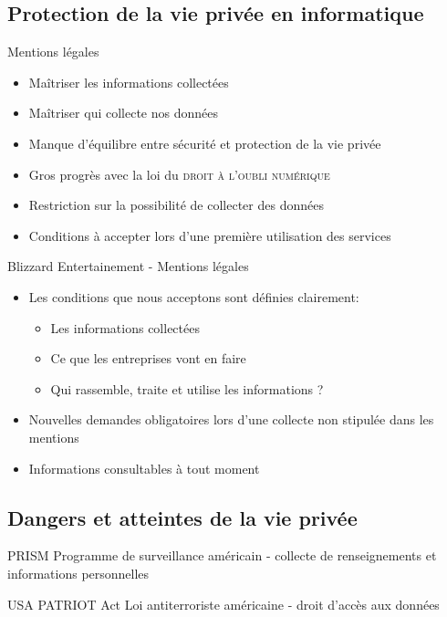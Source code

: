 \documentclass{beamer}
\begin{document}
\subsection{Protection de la vie privée en informatique}
\begin{frame}{Mentions légales}
\begin{itemize}
    \item Maîtriser les informations collectées
    \item Maîtriser qui collecte nos données
    \item Manque d'équilibre entre sécurité et protection de la vie privée
    \item Gros progrès avec la loi du \og \textsc{droit à l'oubli numérique} \fg
    \item Restriction sur la possibilité de collecter des données
    \item Conditions à accepter lors d'une première utilisation des services
\end{itemize}
\end{frame}
\begin{frame}{Blizzard Entertainement - Mentions légales}
\begin{itemize}   
\item Les conditions que nous acceptons sont définies clairement:
  \begin{itemize}
      \item Les informations collectées
      \item Ce que les entreprises vont en faire
      \item Qui rassemble, traite et utilise les informations ?
  \end{itemize}
\item Nouvelles demandes obligatoires lors d'une collecte non stipulée dans les mentions
\item Informations consultables à tout moment
\end{itemize}
\end{frame}
\subsection{Dangers et atteintes de la vie privée}
\begin{frame}
\begin{block}{PRISM}
Programme de surveillance américain - collecte de renseignements et informations personnelles
\end{block}
\begin{block}{USA PATRIOT Act}
Loi antiterroriste américaine - droit d’accès aux données 
\end{block}
\end{frame}
\end{document}
